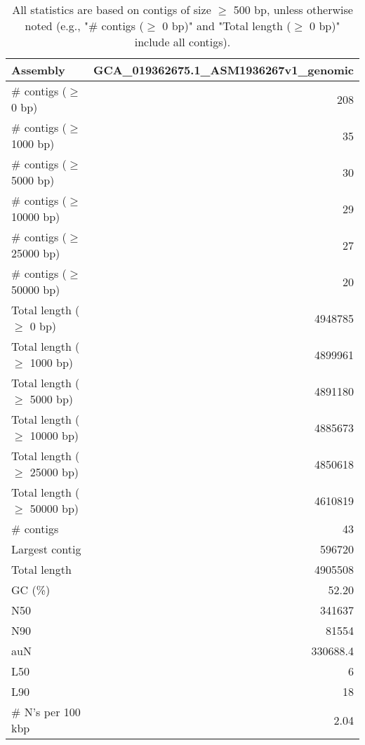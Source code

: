 \documentclass[12pt,a4paper]{article}
\begin{document}
\begin{table}[ht]
\begin{center}
\caption{All statistics are based on contigs of size $\geq$ 500 bp, unless otherwise noted (e.g., "\# contigs ($\geq$ 0 bp)" and "Total length ($\geq$ 0 bp)" include all contigs).}
\begin{tabular}{|l*{1}{|r}|}
\hline
Assembly & GCA\_019362675.1\_ASM1936267v1\_genomic \\ \hline
\# contigs ($\geq$ 0 bp) & 208 \\ \hline
\# contigs ($\geq$ 1000 bp) & 35 \\ \hline
\# contigs ($\geq$ 5000 bp) & 30 \\ \hline
\# contigs ($\geq$ 10000 bp) & 29 \\ \hline
\# contigs ($\geq$ 25000 bp) & 27 \\ \hline
\# contigs ($\geq$ 50000 bp) & 20 \\ \hline
Total length ($\geq$ 0 bp) & 4948785 \\ \hline
Total length ($\geq$ 1000 bp) & 4899961 \\ \hline
Total length ($\geq$ 5000 bp) & 4891180 \\ \hline
Total length ($\geq$ 10000 bp) & 4885673 \\ \hline
Total length ($\geq$ 25000 bp) & 4850618 \\ \hline
Total length ($\geq$ 50000 bp) & 4610819 \\ \hline
\# contigs & 43 \\ \hline
Largest contig & 596720 \\ \hline
Total length & 4905508 \\ \hline
GC (\%) & 52.20 \\ \hline
N50 & 341637 \\ \hline
N90 & 81554 \\ \hline
auN & 330688.4 \\ \hline
L50 & 6 \\ \hline
L90 & 18 \\ \hline
\# N's per 100 kbp & 2.04 \\ \hline
\end{tabular}
\end{center}
\end{table}
\end{document}
